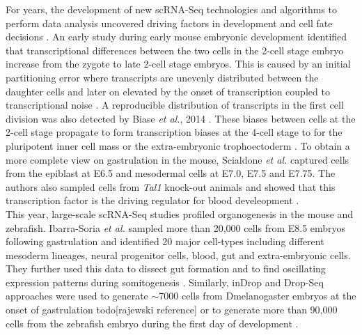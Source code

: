 For years, the development of new scRNA-Seq technologies and algorithms to perform data analysis uncovered driving factors in development and cell fate decisions \citep{Griffiths2018}. An early study during early mouse embryonic development identified that transcriptional differences between the two cells in the 2-cell stage embryo increase from the zygote to late 2-cell stage embryos. This is caused by an initial partitioning error where transcripts are unevenly distributed between the daughter cells and later on elevated by the onset of transcription coupled to transcriptional noise \citep{Piras2014, Shi2015a}. A reproducible distribution of transcripts in the first cell division was also detected by Biase \emph{et al.}, 2014 \cite{Biase2014}. These biases between cells at the 2-cell stage propagate to form transcription biases at the 4-cell stage to for the pluripotent inner cell mass or the extra-embryonic trophoectoderm \citep{Goolam2016, Shi2015a}. To obtain a more complete view on gastrulation in the mouse, Scialdone \emph{et al.} captured cells from the epiblast at E6.5 and mesodermal cells at E7.0, E7.5 and E7.75. The authors also sampled cells from \emph{Tal1} knock-out animals and showed that this transcription factor is the driving regulator for blood develeopment \citep{Scialdone2016}. \\

This year, large-scale scRNA-Seq studies profiled organogenesis in the mouse and zebrafish. Ibarra-Soria \emph{et al.} sampled more than 20,000 cells from E8.5 embryos following gastrulation and identified 20 major cell-types including different mesoderm lineages, neural progenitor cells, blood, gut and extra-embryonic cells. They further used this data to dissect gut formation and to find oscillating expression patterns during somitogenesis \citep{Ibarra-Soria2018}. Similarly, inDrop and Drop-Seq approaches were used to generate $\sim$7000 cells from \gls{Dmelanogaster} embryos at the onset of gastrulation todo{[rajewski reference]} or to generate more than 90,000 cells from the zebrafish embryo during the first day of development \citep{Wagner2018}.

